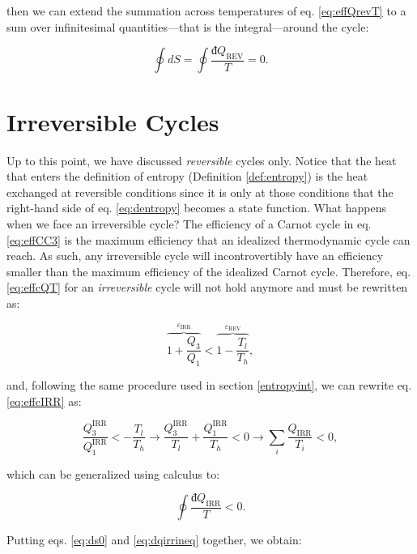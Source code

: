 \documentclass[
  9pt,
]{extbook}
\theoremstyle{definition}
\theoremstyle{definition}
\theoremstyle{definition}
\theoremstyle{definition}
\theoremstyle{remark}
\begin{document}
then we can extend the summation across temperatures of eq. \eqref{eq:effQrevT} to a sum over infinitesimal quantities---that is the integral---around the cycle:

\begin{equation}
\oint dS = \oint \frac{đQ_{\mathrm{REV}}}{T} = 0.
\label{eq:ds0}
\end{equation}

\section{Irreversible Cycles}\label{irreversible-cycles}

Up to this point, we have discussed \emph{reversible} cycles only. Notice that the heat that enters the definition of entropy (Definition \ref{def:entropy}) is the heat exchanged at reversible conditions since it is only at those conditions that the right-hand side of eq. \eqref{eq:dentropy} becomes a state function. What happens when we face an irreversible cycle? The efficiency of a Carnot cycle in eq. \eqref{eq:effCC3} is the maximum efficiency that an idealized thermodynamic cycle can reach. As such, any irreversible cycle will incontrovertibly have an efficiency smaller than the maximum efficiency of the idealized Carnot cycle. Therefore, eq. \eqref{eq:effcQT} for an \emph{irreversible} cycle will not hold anymore and must be rewritten as:

\begin{equation}
\overbrace{1+\frac{Q_3}{Q_1}}^{\varepsilon_{\mathrm{IRR}}} < \overbrace{1-\frac{T_l}{T_h}}^{\varepsilon_{\mathrm{REV}}},
\label{eq:effcIRR}
\end{equation}

and, following the same procedure used in section \ref{entropyint}, we can rewrite eq. \eqref{eq:effcIRR} as:

\begin{equation}
\frac{Q^{\text{IRR}}_3}{Q^{\text{IRR}}_1} < - \frac{T_l}{T_h} \longrightarrow \frac{Q^{\text{IRR}}_3}{T_l} + \frac{Q^{\text{IRR}}_1}{T_h} < 0 \longrightarrow \sum_i \frac{Q_{\text{IRR}}}{T_i} < 0,
\label{eq:effcIRR2}
\end{equation}

which can be generalized using calculus to:

\begin{equation}
\oint \frac{đQ_{\mathrm{IRR}}}{T} < 0.
\label{eq:dqirrineq}
\end{equation}

Putting eqs. \eqref{eq:ds0} and \eqref{eq:dqirrineq} together, we obtain:
\end{document}
